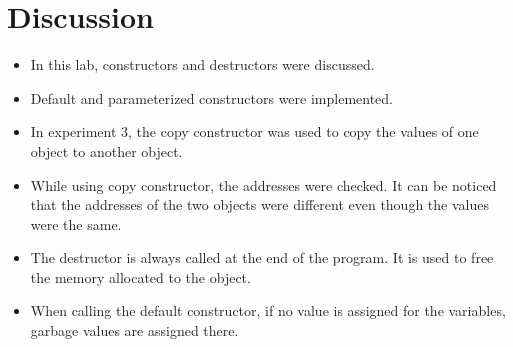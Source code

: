 \documentclass[12pt]{article}
\begin{document}
\newpage
\section*{Discussion}
\begin{itemize}
    \item In this lab, constructors and destructors were discussed.
    \item Default and parameterized constructors were implemented. 
    \item In experiment 3, the copy constructor was used to copy the values of one object to another object. 
    \item While using copy constructor, the addresses were checked. It can be noticed that the addresses of the two objects were different even though the values were the same. 
    \item The destructor is always called at the end of the program. It is used to free the memory allocated to the object. 
    \item When calling the default constructor, if no value is assigned for the variables, garbage values are assigned there.
\end{itemize}
\end{document}
